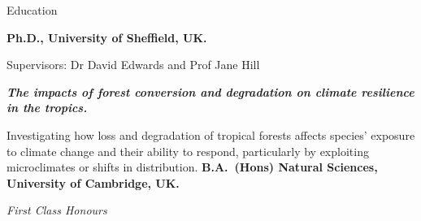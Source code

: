 \begin{rubric}{Education}

%
	\textbf{Ph.D., University of Sheffield, UK.}
	\par Supervisors: Dr David Edwards and Prof Jane Hill
	\par \textbf{\emph{The impacts of forest conversion and degradation on climate resilience in the tropics.}}
	\par Investigating how loss and degradation of tropical forests affects species' exposure to climate change and their ability to respond, particularly by exploiting microclimates or shifts in distribution.
%
\entry*[2010 -- 2013]%
	\textbf{B.A.~(Hons) Natural Sciences, University of Cambridge, UK.}\par
	\emph{First Class Honours}
%
\end{rubric}